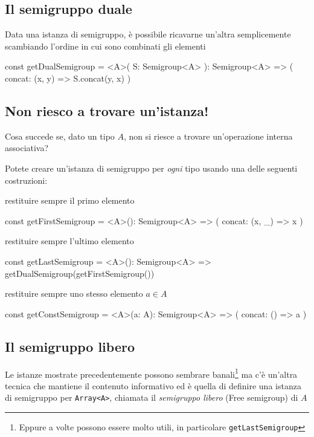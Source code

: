 \documentclass[12pt]{article}
\theoremstyle{definition}
\newenvironment{code}
  {\vspace{0.5cm} \VerbatimEnvironment\begin{typescriptcode}}
  {\end{typescriptcode} \vspace{0.2cm}}
\begin{document}
\subsection{Il semigruppo duale}

Data una istanza di semigruppo, è possibile ricavarne un'altra semplicemente scambiando l'ordine in cui sono combinati gli elementi

\begin{code}
const getDualSemigroup = <A>(
  S: Semigroup<A>
): Semigroup<A> => ({
  concat: (x, y) => S.concat(y, x)
})
\end{code}

\subsection{Non riesco a trovare un'istanza!}

Cosa succede se, dato un tipo $A$, non si riesce a trovare un'operazione interna associativa?

Potete creare un'istanza di semigruppo per \emph{ogni} tipo usando una delle seguenti costruzioni:

restituire sempre il primo elemento

\begin{code}
const getFirstSemigroup = <A>(): Semigroup<A> => ({
  concat: (x, _) => x
})
\end{code}

restituire sempre l'ultimo elemento

\begin{code}
const getLastSemigroup = <A>(): Semigroup<A> =>
  getDualSemigroup(getFirstSemigroup())
\end{code}

restituire sempre uno stesso elemento $a \in A$

\begin{code}
const getConstSemigroup = <A>(a: A): Semigroup<A> => ({
  concat: () => a
})
\end{code}

\subsection{Il semigruppo libero}

Le istanze mostrate precedentemente possono sembrare banali\footnote{Eppure a volte possono essere molto utili, in particolare \texttt{getLastSemigroup}}
ma c'è un'altra tecnica che mantiene il contenuto informativo ed è quella di definire una istanza di semigruppo per \texttt{Array<A>},
chiamata il \emph{semigruppo libero} (Free semigroup) di $A$
\end{document}
